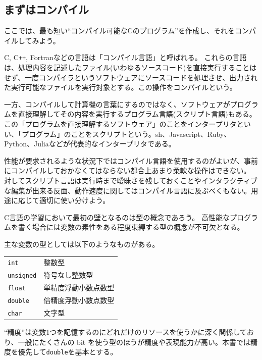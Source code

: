 \subsection{まずはコンパイル}

ここでは、最も短い``コンパイル可能なCのプログラム''を作成し、それをコンパイルしてみよう。

C, C\texttt{++}, Fortranなどの言語は「コンパイル言語」と呼ばれる。
これらの言語は、処理内容を記述したファイル(いわゆるソースコード)を直接実行することはせず、一度コンパイラというソフトウェアにソースコードを処理させ、出力された実行可能なファイルを実行対象とする。この操作をコンパイルという。

一方、コンパイルして計算機の言葉にするのではなく、ソフトウェアがプログラムを直接理解してその内容を実行するプログラム言語(スクリプト言語)もある。この「プログラムを直接理解するソフトウェア」のことをインタープリタといい、「プログラム」のことをスクリプトという。sh、Javascript、Ruby、Python、Juliaなどが代表的なインタープリタである。

性能が要求されるような状況下ではコンパイル言語を使用するのがよいが、事前にコンパイルしておかなくてはならない都合上あまり柔軟な操作はできない。
対してスクリプト言語は実行時まで曖昧さを残しておくことやインタラクティブな編集が出来る反面、動作速度に関してはコンパイル言語に及ぶべくもない。用途に応じて適切に使い分けよう。

C言語の学習において最初の壁となるのは型の概念であろう。
高性能なプログラムを書く場合には変数の素性をある程度束縛する型の概念が不可欠となる。

主な変数の型としては以下のようなものがある。
\begin{table}[H]
    \centering
    \begin{tabular}{ll}
        \texttt{int}      & 整数型               \\
        \texttt{unsigned} & 符号なし整数型       \\
        \texttt{float}    & 単精度浮動小数点数型 \\
        \texttt{double}   & 倍精度浮動小数点数型 \\
        \texttt{char}     & 文字型
    \end{tabular}
\end{table} \noindent
``精度''は変数1つを記憶するのにどれだけのリソースを使うかに深く関係しており、一般にたくさんの bit を使う型のほうが精度や表現能力が高い。本書では精度を優先して\texttt{double}を基本とする。

